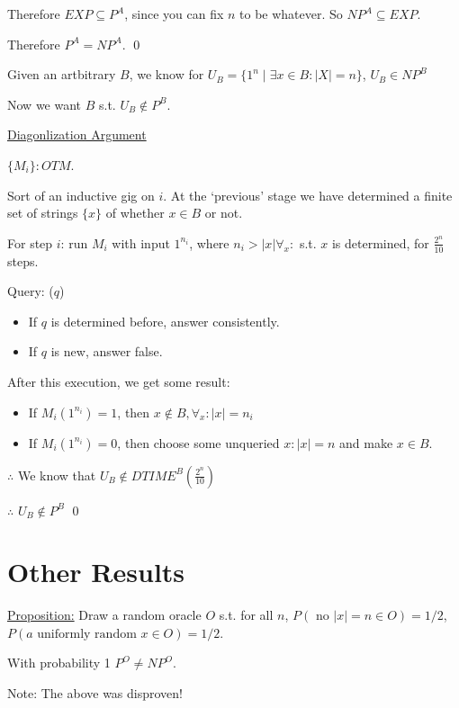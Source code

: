 \documentclass[11pt]{article} %
\begin{document}
Therefore $EXP \subseteq P^A$, since you can fix $n$ to be whatever. So $NP^A \subseteq EXP$.

Therefore $P^A = NP^A$. \qed

 Given an artbitrary $B$, we know for $U_B = \{1^n \mid \exists x \in B : |X| = n\}$, $U_B \in NP^B$

Now we want $B$ s.t. $U_B \not \in P^B$.

\underline{Diagonlization Argument}

$\{M_i\}: OTM$.


Sort of an inductive gig on $i$. At the `previous' stage we have determined a finite set of strings $\{x\}$ of whether $x \in B$ or not.

For step $i$: run $M_i$ with input $1^{n_i}$, where $n_i > |x| \forall_x : $ s.t. $x$ is determined, for $\frac{2^n}{10}$ steps.

Query: ($q$)
\begin{itemize}
\item If $q$ is determined before, answer consistently.
\item If $q$ is new, answer false.
\end{itemize}

After this execution, we get some result:
\begin{itemize}
\item If $M_i(1^{n_i}) = 1$, then $x \not \in B, \forall_x : |x| = n_i$
\item If $M_i(1^{n_i}) = 0$, then choose some unqueried $x : |x| = n$ and make $x \in B$.
\end{itemize}

$\therefore$ We know that $U_B \not \in DTIME^B(\frac{2^n}{10})$

$\therefore$ $U_B \not \in P^B$ \qed

\section{Other Results}

\underline{Proposition:} Draw a random oracle $O$ s.t. for all $n$, $P( \text{ no } |x| = n \in O) = 1/2$, $P(a \text{ uniformly random } x \in O) = 1/2$.

With probability 1 $P^O \neq NP^O$.





Note: The above was disproven!

\end{document}
